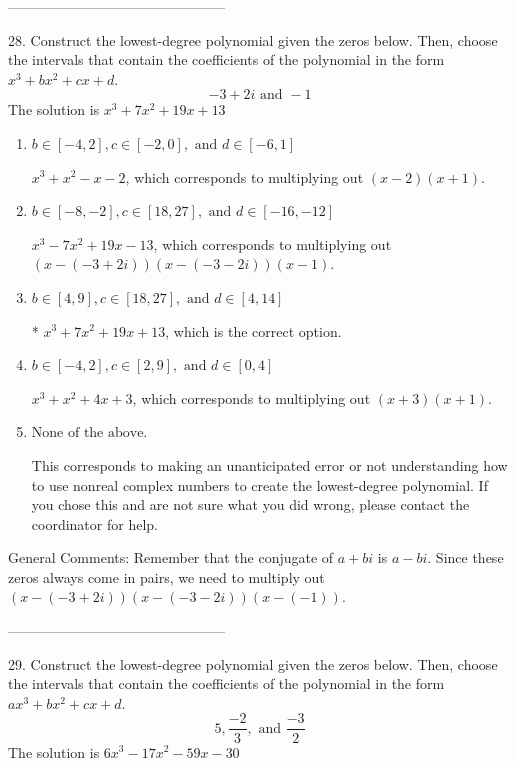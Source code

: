 \documentclass{extbook}[14pt]
\begin{document}
-----------------------------------------------

28. Construct the lowest-degree polynomial given the zeros below. Then, choose the intervals that contain the coefficients of the polynomial in the form $x^3+bx^2+cx+d$.
\[ -3 + 2i \text{ and } -1 \] 
The solution is $ x^{3} +7 x^{2} +19 x + 13 $ 

\begin{enumerate}[label=\Alph*.] 
\item $ b \in [-4, 2], c \in [-2, 0], \text{ and } d \in [-6, 1] $ 

 $x^{3} + x^{2} -x -2$, which corresponds to multiplying out $(x -2)(x + 1)$. 
\item $ b \in [-8, -2], c \in [18, 27], \text{ and } d \in [-16, -12] $ 

 $x^{3} -7 x^{2} +19 x -13$, which corresponds to multiplying out $(x-(-3 + 2i))(x-(-3 - 2i))(x -1)$. 
\item $ b \in [4, 9], c \in [18, 27], \text{ and } d \in [4, 14] $ 

 * $x^{3} +7 x^{2} +19 x + 13$, which is the correct option. 
\item $ b \in [-4, 2], c \in [2, 9], \text{ and } d \in [0, 4] $ 

 $x^{3} + x^{2} +4 x + 3$, which corresponds to multiplying out $(x + 3)(x + 1)$. 
\item $ \text{None of the above.} $ 

 This corresponds to making an unanticipated error or not understanding how to use nonreal complex numbers to create the lowest-degree polynomial. If you chose this and are not sure what you did wrong, please contact the coordinator for help. 
\end{enumerate} 
 
General Comments: Remember that the conjugate of $a+bi$ is $a-bi$. Since these zeros always come in pairs, we need to multiply out $(x-(-3 + 2i))(x-(-3 - 2i))(x-(-1))$.

-----------------------------------------------

29. Construct the lowest-degree polynomial given the zeros below. Then, choose the intervals that contain the coefficients of the polynomial in the form $ax^3+bx^2+cx+d$.
\[ 5, \frac{-2}{3}, \text{ and } \frac{-3}{2} \] 
The solution is $ 6x^{3} -17 x^{2} -59 x -30 $ 
\end{document}
